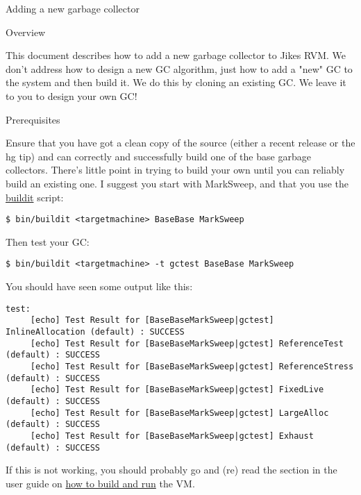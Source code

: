 \begin{section}{Adding a new garbage collector}
\label{sec:addinganewgarbagecollector}


\begin{subsection}{Overview}

This document describes how to add a new garbage collector to Jikes RVM.  We don't address how to design a new GC algorithm, just how to add a "new" GC to the system and then build it.  We do this by cloning an existing GC.  We leave it to you to design your own GC!

\end{subsection}

\begin{subsection}{Prerequisites}

Ensure that you have got a clean copy of the source (either a recent release or the hg tip) and can correctly and successfully build one of the base garbage collectors.  There's little point in trying to build your own until you can reliably build an existing one.  I suggest you start with MarkSweep, and that you use the \hyperref[sec:usingbuildit]{buildit} script:

\begin{lstlisting}
$ bin/buildit <targetmachine> BaseBase MarkSweep
\end{lstlisting}

Then test your GC:

\begin{lstlisting}
$ bin/buildit <targetmachine> -t gctest BaseBase MarkSweep
\end{lstlisting}

You should have seen some output like this:

\begin{lstlisting}
test:
     [echo] Test Result for [BaseBaseMarkSweep|gctest] InlineAllocation (default) : SUCCESS
     [echo] Test Result for [BaseBaseMarkSweep|gctest] ReferenceTest (default) : SUCCESS
     [echo] Test Result for [BaseBaseMarkSweep|gctest] ReferenceStress (default) : SUCCESS
     [echo] Test Result for [BaseBaseMarkSweep|gctest] FixedLive (default) : SUCCESS
     [echo] Test Result for [BaseBaseMarkSweep|gctest] LargeAlloc (default) : SUCCESS
     [echo] Test Result for [BaseBaseMarkSweep|gctest] Exhaust (default) : SUCCESS  
\end{lstlisting}

If this is not working, you should probably go and (re) read the section in the user guide on \hyperref[part:careandfeeding]{how to build and run} the VM.


\end{subsection}
\end{section}
